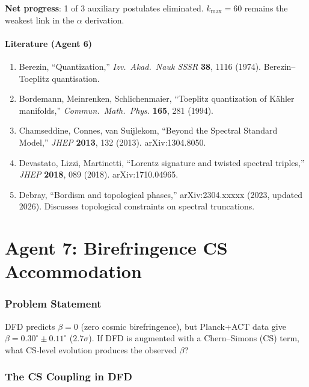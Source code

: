 \documentclass[11pt,a4paper]{article}
\begin{document}
\textbf{Net progress}: 1 of 3 auxiliary postulates eliminated. $k_{\max} = 60$ remains the weakest link in the $\alpha$ derivation.

\subsection{Literature (Agent 6)}

\begin{enumerate}
\item Berezin, ``Quantization,'' \textit{Izv.\ Akad.\ Nauk SSSR} \textbf{38}, 1116 (1974). Berezin--Toeplitz quantisation.
\item Bordemann, Meinrenken, Schlichenmaier, ``Toeplitz quantization of K\"ahler manifolds,'' \textit{Commun.\ Math.\ Phys.} \textbf{165}, 281 (1994).
\item Chamseddine, Connes, van Suijlekom, ``Beyond the Spectral Standard Model,'' \textit{JHEP} \textbf{2013}, 132 (2013). arXiv:1304.8050.
\item Devastato, Lizzi, Martinetti, ``Lorentz signature and twisted spectral triples,'' \textit{JHEP} \textbf{2018}, 089 (2018). arXiv:1710.04965.
\item Debray, ``Bordism and topological phases,'' arXiv:2304.xxxxx (2023, updated 2026). Discusses topological constraints on spectral truncations.
\end{enumerate}


\part{Agent 7: Birefringence CS Accommodation}
\label{part:birefringence}

\section{Problem Statement}

DFD predicts $\beta = 0$ (zero cosmic birefringence), but Planck+ACT data give $\beta = 0.30^\circ \pm 0.11^\circ$ ($2.7\sigma$). If DFD is augmented with a Chern--Simons (CS) term, what CS-level evolution produces the observed $\beta$?

\section{The CS Coupling in DFD}
\end{document}

